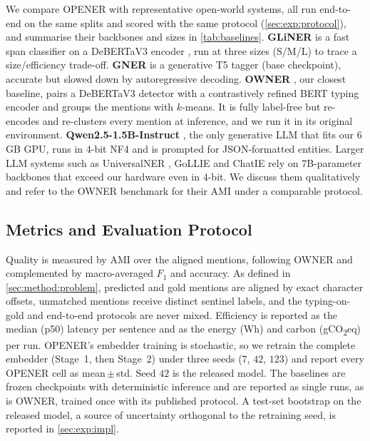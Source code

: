 \documentclass[pdflatex,sn-basic,Numbered]{sn-jnl}
\begin{document}
{
We compare OPENER with representative open-world systems, all run end-to-end on the same splits and scored with the same protocol (\autoref{sec:exp:protocol}), and summarise their backbones and sizes in \autoref{tab:baselines}.
\textbf{GLiNER} \cite{zaratiana2024gliner} is a fast span classifier on a DeBERTaV3 encoder \cite{he2023debertav3}, run at three sizes (S/M/L) to trace a size/efficiency trade-off.
\textbf{GNER} \cite{ding2024gner} is a generative T5 tagger \cite{raffel2020t5} (base checkpoint), accurate but slowed down by autoregressive decoding.
\textbf{OWNER} \cite{genest2025owner}, our closest baseline, pairs a DeBERTaV3 detector with a contrastively refined BERT typing encoder \cite{devlin2019bert} and groups the mentions with $k$-means. It is fully label-free but re-encodes and re-clusters every mention at inference, and we run it in its original environment.
\textbf{Qwen2.5-1.5B-Instruct} \cite{qwen2025}, the only generative LLM that fits our $6$\,GB GPU, runs in 4-bit NF4 \cite{dettmers2023qlora} and is prompted for JSON-formatted entities.
Larger LLM systems such as UniversalNER \cite{zhou2024universalner}, GoLLIE \cite{sainz2024gollie} and ChatIE \cite{wei2024chatie} rely on $7$B-parameter backbones \cite{touvron2023llama} that exceed our hardware even in 4-bit. We discuss them qualitatively and refer to the OWNER benchmark \cite{genest2025owner} for their AMI under a comparable protocol.
\par}

\subsection{Metrics and Evaluation Protocol}
\label{sec:exp:metrics}
\label{sec:exp:protocol}
{
Quality is measured by AMI \cite{vinh2010ami} over the aligned mentions, following OWNER \cite{genest2025owner} and complemented by macro-averaged $F_1$ and accuracy.
As defined in \autoref{sec:method:problem}, predicted and gold mentions are aligned by exact character offsets, unmatched mentions receive distinct sentinel labels, and the typing-on-gold and end-to-end protocols are never mixed.
Efficiency is reported as the median (p50) latency per sentence and as the energy (Wh) and carbon (gCO\textsubscript{2}eq) per run.
OPENER's embedder training is stochastic, so we retrain the complete embedder (Stage~1, then Stage~2) under three seeds ($7$, $42$, $123$) and report every OPENER cell as mean\,$\pm$\,std. Seed $42$ is the released model.
The baselines are frozen checkpoints with deterministic inference and are reported as single runs, as is OWNER, trained once with its published protocol.
A test-set bootstrap on the released model, a source of uncertainty orthogonal to the retraining seed, is reported in \autoref{sec:exp:impl}.
\par}
\end{document}
